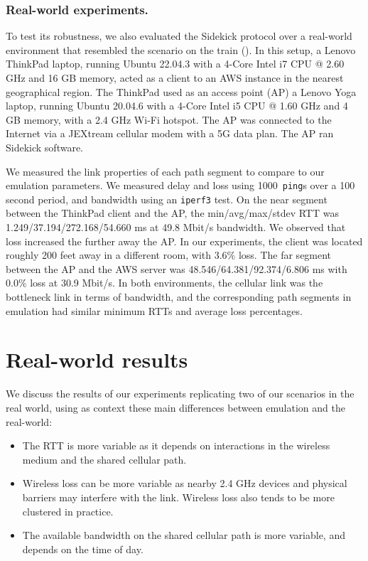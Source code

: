 \subsubsection{Real-world experiments.}

To test its robustness, we also evaluated the Sidekick protocol over a
real-world environment that resembled the scenario on the train
(). In this setup, a Lenovo ThinkPad laptop,
running Ubuntu 22.04.3 with a 4-Core Intel i7 CPU @ 2.60 GHz and 16 GB memory,
acted as a client to an AWS instance in the nearest geographical region. The
ThinkPad used as an access point (AP) a Lenovo Yoga laptop, running Ubuntu
20.04.6 with a 4-Core Intel i5 CPU @ 1.60 GHz and 4 GB memory, with a 2.4 GHz
Wi-Fi hotspot. The AP was connected to the Internet via a JEXtream cellular
modem with a 5G data plan. The AP ran Sidekick software.

We measured the link properties of each path segment to compare to
our emulation parameters. We measured delay and loss using 1000~\texttt{ping}s
over a 100 second period, and bandwidth using an \texttt{iperf3} test.
On the near segment between the ThinkPad client and the AP,
the min/avg/max/stdev RTT was 1.249/37.194/272.168/54.660 ms
at 49.8 Mbit/s bandwidth. We observed that loss increased
the further away the AP. In our experiments, the client was located roughly
200 feet away in a different room, with 3.6\% loss.
The far segment between the AP and the AWS server was
48.546/64.381/92.374/6.806 ms with 0.0\% loss at 30.9 Mbit/s.
In both environments, the cellular link was the bottleneck link in terms of
bandwidth, and the corresponding path segments in emulation had similar
minimum RTTs and average loss percentages.

\section{Real-world results}
\label{sec:sidekick:real-world}



We discuss the results of our experiments replicating two of our scenarios in
the real world, using as context
these main differences between emulation and the real-world:

\begin{itemize}[noitemsep,topsep=0pt]
  \item The RTT is more variable as it depends on interactions in the
  wireless medium and the shared cellular path.
  \item Wireless loss can be more variable as nearby 2.4 GHz devices and
  physical barriers may interfere with the link. Wireless loss also tends
  to be more clustered in practice.
  \item The available bandwidth on the shared cellular path is more variable,
  and depends on the time of day.
\end{itemize}

